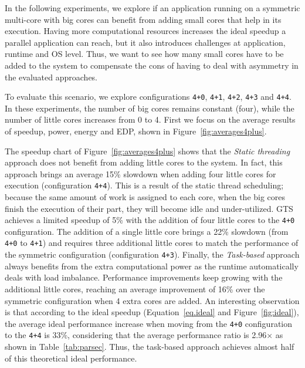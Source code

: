 In the following experiments, we explore if an application running on a symmetric multi-core with big cores can benefit from adding small cores that help in its execution. Having more computational resources increases the ideal speedup a parallel application can reach, but it also introduces challenges at application, runtime and OS level. Thus, we want to see how many small cores have to be added to the system to compensate the cons of having to deal with asymmetry in the evaluated approaches.

To evaluate this scenario, we explore configurations \texttt{4+0}, \texttt{4+1}, \texttt{4+2}, \texttt{4+3} and \texttt{4+4}. In these experiments, the number of big cores remains constant (four), while the number of little cores increases from 0 to 4. First we focus on the average results of speedup, power, energy and EDP, shown in Figure~\ref{fig:averages4plus}.

The speedup chart of Figure~\ref{fig:averages4plus} shows that the \emph{Static threading} approach does not benefit from adding little cores to the system.
In fact, this approach brings an average 15\% slowdown when adding four little cores for execution (configuration \texttt{4+4}).
This is a result of the static thread scheduling; because the same amount of work is assigned to each core, when the big cores finish the execution of their part, they will become idle and under-utilized. 
GTS achieves a limited speedup of 5\% with the addition of four little cores to the \texttt{4+0} configuration. The addition of a single little core brings a 22\% slowdown (from \texttt{4+0} to \texttt{4+1}) and requires three additional little cores to match the performance of the symmetric configuration (configuration \texttt{4+3}).  Finally, the \emph{Task-based} approach always benefits from the extra computational power as the runtime automatically deals with load imbalance. Performance improvements keep growing with the additional little cores, reaching an average improvement of 16\% over the symmetric configuration when 4 extra cores are added. An interesting observation is that according to the ideal speedup (Equation~\ref{eq.ideal} and Figure~\ref{fig:ideal}), the average ideal performance increase when moving from the \texttt{4+0} configuration to the \texttt{4+4} is 33\%, considering that the average performance ratio is 2.96$\times$ as shown in Table~\ref{tab:parsec}. Thus, the task-based approach achieves almost half of this theoretical ideal performance.




